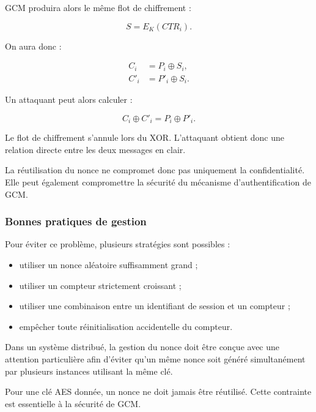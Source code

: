 \documentclass[12pt,a4paper]{article}
\begin{document}
GCM produira alors le même flot de chiffrement :

\begin{equation}
S = E_K(CTR_i).
\end{equation}

On aura donc :

\begin{align}
C_i &= P_i \oplus S_i,\\
C'_i &= P'_i \oplus S_i.
\end{align}

Un attaquant peut alors calculer :

\begin{equation}
C_i \oplus C'_i
=
P_i \oplus P'_i.
\label{eq:nonce_reuse_xor}
\end{equation}

Le flot de chiffrement s'annule lors du XOR. L'attaquant obtient donc
une relation directe entre les deux messages en clair.

La réutilisation du nonce ne compromet donc pas uniquement la
confidentialité. Elle peut également compromettre la sécurité du
mécanisme d'authentification de GCM.

\subsubsection{Bonnes pratiques de gestion}

Pour éviter ce problème, plusieurs stratégies sont possibles :

\begin{itemize}
    \item utiliser un nonce aléatoire suffisamment grand ;
    \item utiliser un compteur strictement croissant ;
    \item utiliser une combinaison entre un identifiant de session
    et un compteur ;
    \item empêcher toute réinitialisation accidentelle du compteur.
\end{itemize}

Dans un système distribué, la gestion du nonce doit être conçue avec
une attention particulière afin d'éviter qu'un même nonce soit
généré simultanément par plusieurs instances utilisant la même clé.

\begin{tcolorbox}[
    colback=gray!5,
    colframe=black!60,
    title=\textbf{Règle fondamentale de GCM}
]
Pour une clé AES donnée, un nonce ne doit jamais être réutilisé.
Cette contrainte est essentielle à la sécurité de GCM.
\end{tcolorbox}
\end{document}
